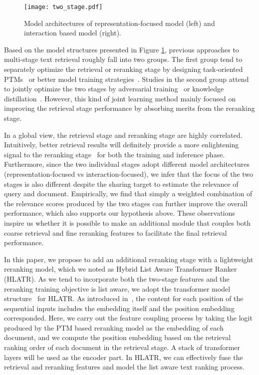 \documentclass[11pt]{article}
\begin{document}
\begin{figure}[t]
    \centering
    \texttt{[image: two\_stage.pdf]} 
    \caption{Model architectures of representation-focused model (left) and interaction based model (right).}
    \label{fig:two-type-model}
\end{figure}

Based on the model structures presented in Figure \ref{fig:two-type-model}, previous approaches to multi-stage text retrieval roughly fall into two groups. The first group tend to separately optimize the retrieval or reranking stage by designing task-oriented PTMs~\cite{gao2021condenser,gao2021unsupervised,ma2021b} or better model training strategies~\cite{xiong2021approximate,gao2021rethink}. Studies in the second group attend to jointly optimize the two stages by adversarial training~\cite{zhang2021adversarial} or knowledge distillation~\cite{ren2021rocketqav2,lu2022erniesearch}. However, this kind of joint learning method mainly focused on improving the retrieval stage performance by absorbing merits from the reranking stage.

In a global view, the retrieval stage and reranking stage are highly correlated. Intuitively, better retrieval results will definitely provide a more enlightening signal to the reranking stage~\cite{gao2021rethink} for both the training and inference phase. Furthermore, since the two individual stages adopt different model architectures (representation-focused vs interaction-focused), we infer that the focus of the two stages is also different despite the sharing target to estimate the relevance of query and document. Empirically, we find that simply a weighted combination of the relevance scores produced by the two stages can further improve the overall performance, which also supports our hypothesis above. These observations inspire us whether it is possible to make an additional module that couples both coarse retrieval and fine reranking features to facilitate the final retrieval performance.

In this paper, we propose to add an additional reranking stage with a lightweight reranking model, which we noted as Hybrid List Aware Transformer Ranker (HLATR). As we tend to incorporate both the two-stage features and the reranking training objective is list aware, we adopt the transformer model structure~\cite{vaswani2017attention} for HLATR. As introduced in~\cite{vaswani2017attention}, the content for each position of the sequential inputs includes the embedding itself and the position embedding corresponded. Here, we carry out the feature coupling process by taking the logit produced by the PTM based reranking model as the embedding of each document, and we compute the position embedding based on the retrieval ranking order of each document in the retrieval stage. A stack of transformer layers will be used as the encoder part. In HLATR, we can effectively fuse the retrieval and reranking features and model the list aware text ranking process. 
\end{document}
